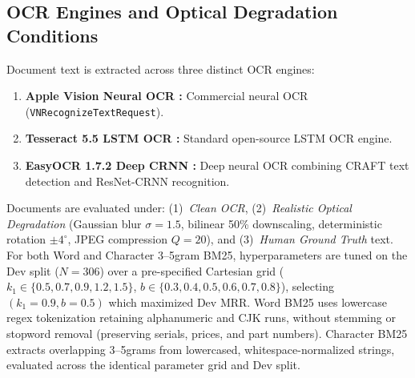 \subsection{OCR Engines and Optical Degradation Conditions}
Document text is extracted across three distinct OCR engines:
\begin{enumerate}
    \setlength{\itemsep}{0.2pt plus 0.1pt}
    \setlength{\parskip}{0pt}
    \item \textbf{Apple Vision Neural OCR \cite{apple2020vision}:} Commercial neural OCR (\texttt{VNRecognizeTextRequest}).
    \item \textbf{Tesseract 5.5 LSTM OCR \cite{smith2007tesseract}:} Standard open-source LSTM OCR engine.
    \item \textbf{EasyOCR 1.7.2 Deep CRNN \cite{jaidedai2020easyocr}:} Deep neural OCR combining CRAFT text detection and ResNet-CRNN recognition.
\end{enumerate}
Documents are evaluated under: (1)~\emph{Clean OCR}, (2)~\emph{Realistic Optical Degradation} (Gaussian blur $\sigma=1.5$, bilinear 50\% downscaling, deterministic rotation $\pm 4^\circ$, JPEG compression $Q=20$), and (3)~\emph{Human Ground Truth} text. For both Word and Character 3--5gram BM25, hyperparameters are tuned on the Dev split ($N=306$) over a pre-specified Cartesian grid ($k_1 \in \{0.5, 0.7, 0.9, 1.2, 1.5\}$, $b \in \{0.3, 0.4, 0.5, 0.6, 0.7, 0.8\}$), selecting $(k_1=0.9, b=0.5)$ which maximized Dev MRR. Word BM25 uses lowercase regex tokenization retaining alphanumeric and CJK runs, without stemming or stopword removal (preserving serials, prices, and part numbers). Character BM25 extracts overlapping 3--5grams from lowercased, whitespace-normalized strings, evaluated across the identical parameter grid and Dev split.

